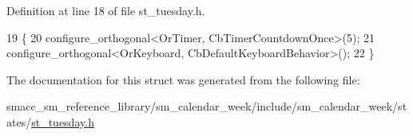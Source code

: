 Definition at line 18 of file st\+\_\+tuesday.\+h.


\begin{DoxyCode}
19     \{
20         configure\_orthogonal<OrTimer, CbTimerCountdownOnce>(5);   
21         configure\_orthogonal<OrKeyboard, CbDefaultKeyboardBehavior>();
22     \}
\end{DoxyCode}


The documentation for this struct was generated from the following file\+:\begin{DoxyCompactItemize}
\item 
smacc\+\_\+sm\+\_\+reference\+\_\+library/sm\+\_\+calendar\+\_\+week/include/sm\+\_\+calendar\+\_\+week/states/\hyperlink{sm__calendar__week_2include_2sm__calendar__week_2states_2st__tuesday_8h}{st\+\_\+tuesday.\+h}\end{DoxyCompactItemize}

